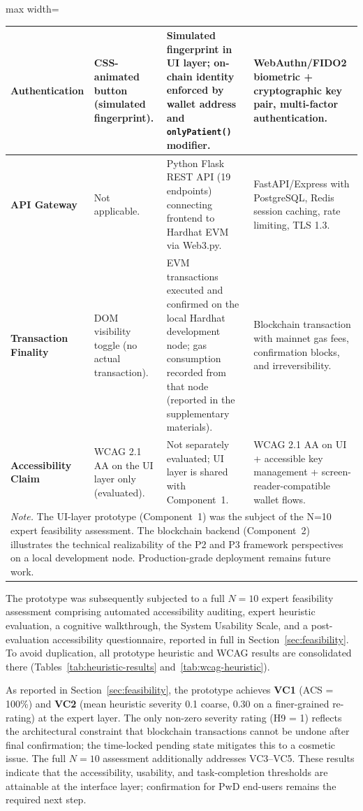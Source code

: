 \documentclass[journal,onecolumn]{IEEEtran}
\begin{document}
\begin{table}[htbp]
\begin{adjustbox}{max width=\columnwidth}
\begin{tabular}{|p{2.8cm}|p{3.8cm}|p{3.8cm}|p{3.8cm}|}
\hline
\textbf{Authentication} & CSS-animated button (simulated fingerprint). & Simulated fingerprint in UI layer; on-chain identity enforced by wallet address and \texttt{onlyPatient()} modifier. & WebAuthn/FIDO2 biometric + cryptographic key pair, multi-factor authentication. \\
\hline
\textbf{API Gateway} & Not applicable. & Python Flask REST API (19 endpoints) connecting frontend to Hardhat EVM via Web3.py. & FastAPI/Express with PostgreSQL, Redis session caching, rate limiting, TLS 1.3. \\
\hline
\textbf{Transaction Finality} & DOM visibility toggle (no actual transaction). & EVM transactions executed and confirmed on the local Hardhat development node; gas consumption recorded from that node (reported in the supplementary materials). & Blockchain transaction with mainnet gas fees, confirmation blocks, and irreversibility. \\
\hline
\textbf{Accessibility Claim} & WCAG 2.1 AA on the UI layer only (evaluated). & Not separately evaluated; UI layer is shared with Component~1. & WCAG 2.1 AA on UI + accessible key management + screen-reader-compatible wallet flows. \\
\hline
\multicolumn{4}{|p{11.4cm}|}{\footnotesize\textit{Note.} The UI-layer prototype (Component~1) was the subject of the N=10 expert feasibility assessment. The blockchain backend (Component~2) illustrates the technical realizability of the P2 and P3 framework perspectives on a local development node. Production-grade deployment remains future work.} \\
\hline
\end{tabular}
\end{adjustbox}
\end{table}

The prototype was subsequently subjected to a full $N=10$ expert feasibility assessment comprising automated accessibility auditing, expert heuristic evaluation, a cognitive walkthrough, the System Usability Scale, and a post-evaluation accessibility questionnaire, reported in full in Section~\ref{sec:feasibility}. To avoid duplication, all prototype heuristic and WCAG results are consolidated there (Tables~\ref{tab:heuristic-results} and~\ref{tab:wcag-heuristic}).

As reported in Section~\ref{sec:feasibility}, the prototype achieves \textbf{VC1} (ACS = 100\%) and \textbf{VC2} (mean heuristic severity 0.1 coarse, 0.30 on a finer-grained re-rating) at the expert layer. The only non-zero severity rating (H9 = 1) reflects the architectural constraint that blockchain transactions cannot be undone after final confirmation; the time-locked pending state mitigates this to a cosmetic issue. The full $N=10$ assessment additionally addresses VC3--VC5. These results indicate that the accessibility, usability, and task-completion thresholds are attainable at the interface layer; confirmation for PwD end-users remains the required next step.
\end{document}
